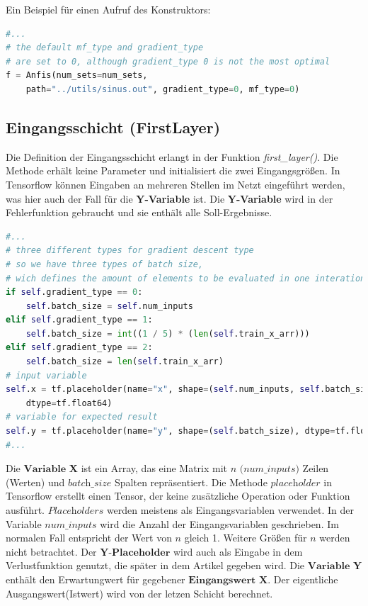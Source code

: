 Ein Beispiel für einen Aufruf des Konstruktors:

\begin{lstlisting}[language=Python]
#...
# the default mf_type and gradient_type 
# are set to 0, although gradient_type 0 is not the most optimal
f = Anfis(num_sets=num_sets, 
	path="../utils/sinus.out", gradient_type=0, mf_type=0)
\end{lstlisting}

\subsection{Eingangsschicht (FirstLayer)}\label{eingangsschicht-first-layer}

Die Definition der Eingangsschicht erlangt in der Funktion \emph{first\_layer()}. Die Methode erhält keine Parameter und initialisiert die zwei Eingangsgrößen. In Tensorflow können Eingaben an mehreren Stellen im Netzt eingeführt werden, was hier auch der Fall für die \textbf{Y-Variable} ist. Die \textbf{Y-Variable} wird in der Fehlerfunktion gebraucht und sie enthält alle Soll-Ergebnisse.


\begin{lstlisting}[language=Python]
#...
# three different types for gradient descent type
# so we have three types of batch size, 
# wich defines the amount of elements to be evaluated in one interation
if self.gradient_type == 0:
	self.batch_size = self.num_inputs
elif self.gradient_type == 1:
	self.batch_size = int((1 / 5) * (len(self.train_x_arr)))  
elif self.gradient_type == 2:
	self.batch_size = len(self.train_x_arr)
# input variable
self.x = tf.placeholder(name="x", shape=(self.num_inputs, self.batch_size), 
	dtype=tf.float64)
# variable for expected result
self.y = tf.placeholder(name="y", shape=(self.batch_size), dtype=tf.float64)
#...
\end{lstlisting}

Die $\textbf{Variable X}$ ist ein Array, das eine Matrix mit $\textit{n (num\_inputs)}$ Zeilen (Werten) und $\textit{batch\_size}$ Spalten repräsentiert. Die Methode $\textit{placeholder}$ in Tensorflow erstellt einen Tensor, der keine zusätzliche Operation oder Funktion ausführt. $\textit{Placeholders}$ werden meistens als Eingangsvariablen verwendet. In der Variable $\textit{num\_inputs}$ wird die Anzahl der Eingangsvariablen geschrieben. Im normalen Fall entspricht der Wert von $\textit{n}$ gleich 1. Weitere Größen für $\textit{n}$ werden nicht betrachtet. Der $\textbf{Y-Placeholder}$ wird auch als Eingabe in dem Verlustfunktion genutzt, die später in dem Artikel gegeben wird. Die $\textbf{Variable Y}$ enthält den Erwartungwert für gegebener $\textbf{Eingangswert X}$. Der eigentliche
Ausgangswert(Istwert) wird von der letzen Schicht berechnet.

